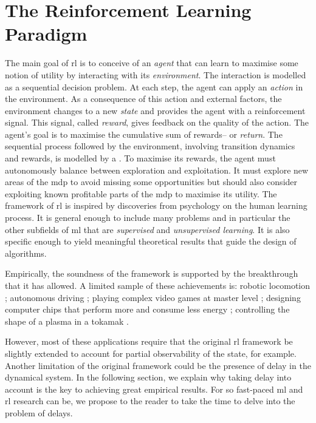 \section{The Reinforcement Learning Paradigm}

The main goal of \gls{rl} is to conceive of an \emph{agent} that can learn to maximise some notion of utility by interacting with its \emph{environment}. 
The interaction is modelled as a sequential decision problem. 
At each step, the agent can apply an \emph{action} in the environment.
As a consequence of this action and external factors, the environment changes to a new \emph{state} and provides the agent with a reinforcement signal.
This signal, called \emph{reward}, gives feedback on the quality of the action. 
The agent's goal is to maximise the cumulative sum of rewards-- or \emph{return}.
The sequential process followed by the environment, involving transition dynamics and rewards, is modelled by a . 
To maximise its rewards, the agent must autonomously balance between exploration and exploitation.  
It must explore new areas of the \gls{mdp} to avoid missing some opportunities but should also consider exploiting known profitable parts of the \gls{mdp} to maximise its utility. 
The framework of \gls{rl} is inspired by discoveries from psychology on the human learning process. 
It is general enough to include many problems and in particular the other subfields of \gls{ml} that are \emph{supervised} and \emph{unsupervised learning}. 
It is also specific enough to yield meaningful theoretical results that guide the design of algorithms.

Empirically, the soundness of the framework is supported by the breakthrough that it has allowed. 
A limited sample of these achievements is:
robotic locomotion \cite{haarnoja2018learning};
autonomous driving \cite{kiran2021deep};
playing complex video games at master level \cite{vinyals2019grandmaster}; designing computer chips that perform more and consume less energy \cite{mirhoseini2021graph};
controlling the shape of a plasma in a tokamak \cite{degrave2022magnetic}.


However, most of these applications require that the original \gls{rl} framework be slightly extended to account for partial observability of the state, for example. 
Another limitation of the original framework could be the presence of delay in the dynamical system. 
In the following section, we explain why taking delay into account is the key to achieving great empirical results.
For so fast-paced \gls{ml} and \gls{rl} research can be, we propose to the reader to take the time to delve into the problem of delays.
